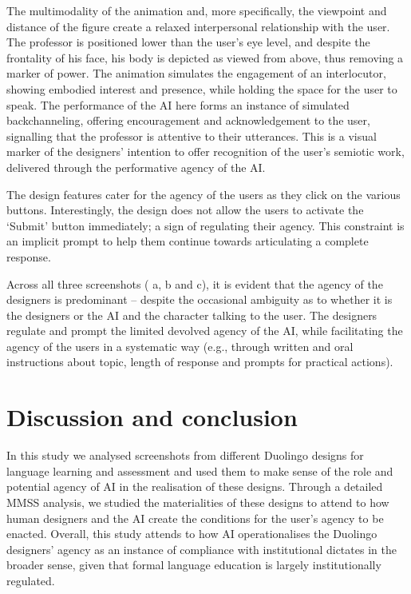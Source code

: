 \documentclass[english]{textolivre}
\begin{document}
\begin{enumerate}[label=\alph*.]
The multimodality of the animation and, more specifically, the viewpoint and distance of the figure create a relaxed interpersonal relationship with the user. The professor is positioned lower than the user’s eye level, and despite the frontality of his face, his body is depicted as viewed from above, thus removing a marker of power. The animation simulates the engagement of an interlocutor, showing embodied interest and presence, while holding the space for the user to speak. The performance of the AI here forms an instance of simulated backchanneling, offering encouragement and acknowledgement to the user, signalling that the professor is attentive to their utterances. This is a visual marker of the designers’ intention to offer recognition of the user’s semiotic work, delivered through the performative agency of the AI.

The design features cater for the agency of the users as they click on the various buttons. Interestingly, the design does not allow the users to activate the ‘Submit’ button immediately; a sign of regulating their agency. This constraint is an implicit prompt to help them continue towards articulating a complete response.

Across all three screenshots ( a, b and c), it is evident that the agency of the designers is predominant – despite the occasional ambiguity as to whether it is the designers or the AI and the character talking to the user. The designers regulate and prompt the limited devolved agency of the AI, while facilitating the agency of the users in a systematic way (e.g., through written and oral instructions about topic, length of response and prompts for practical actions).

\end{enumerate}

\section{Discussion and conclusion}\label{sec-organizacao-latex}
In this study we analysed screenshots from different Duolingo designs for language learning and assessment and used them to make sense of the role and potential agency of AI in the realisation of these designs. Through a detailed MMSS analysis, we studied the materialities of these designs to attend to how human designers and the AI create the conditions for the user’s agency to be enacted. Overall, this study attends to how AI operationalises the Duolingo designers’ agency as an instance of compliance with institutional dictates in the broader sense, given that formal language education is largely institutionally regulated.
\end{document}
